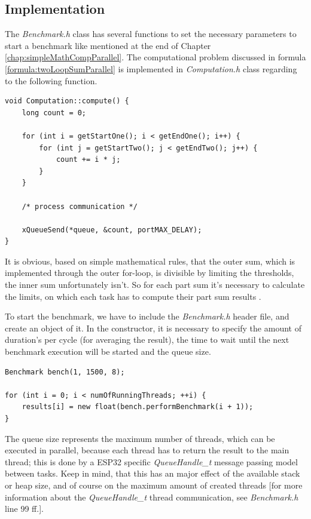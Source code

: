 \subsection{Implementation}

The \textit{Benchmark.h} class has several functions to set the necessary parameters to start a benchmark like mentioned at the end of Chapter \ref{chap:simpleMathCompParallel}. The computational problem discussed in formula \ref{formula:twoLoopSumParallel} is implemented in \textit{Computation.h} class regarding to the following function.

\begin{lstlisting}
void Computation::compute() {
	long count = 0;

	for (int i = getStartOne(); i < getEndOne(); i++) {
		for (int j = getStartTwo(); j < getEndTwo(); j++) {
			count += i * j;
		}
	}

	/* process communication */
	
	xQueueSend(*queue, &count, portMAX_DELAY);
}
\end{lstlisting}

It is obvious, based on simple mathematical rules, that the outer sum, which is implemented through the outer for-loop, is divisible by limiting the thresholds, the inner sum unfortunately isn't. So for each part sum it's necessary to calculate the limits, on which each task has to compute their part sum results \parencite[see][Benchmark.h, line 94 ff.]{internet12}.

\newpage

\noindent To start the benchmark, we have to include the \textit{Benchmark.h} header file, and create an object of it. In the constructor, it is necessary to specify the amount of duration's per cycle (for averaging the result), the time to wait until the next benchmark execution will be started and the queue size.

\begin{lstlisting}
Benchmark bench(1, 1500, 8);

for (int i = 0; i < numOfRunningThreads; ++i) {
	results[i] = new float(bench.performBenchmark(i + 1));
}
\end{lstlisting}

The queue size represents the maximum number of threads, which can be executed in parallel, because each thread has to return the result to the main thread; this is done by a ESP32 specific \textit{QueueHandle\_t} message passing model between tasks. Keep in mind, that this has an major effect of the available stack or heap size, and of course on the maximum amount of created threads [for more information about the \textit{QueueHandle\_t} thread communication, see \textit{Benchmark.h} line 99 ff.].\\

